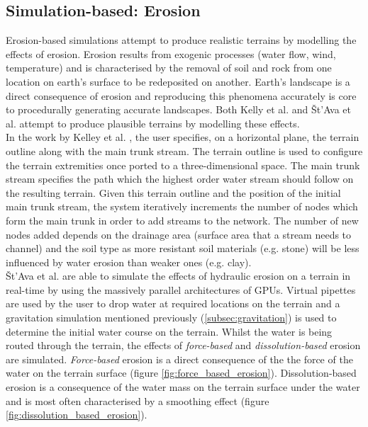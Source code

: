 \subsection{Simulation-based: Erosion}

Erosion-based simulations attempt to produce realistic terrains by modelling the effects of erosion. Erosion results from exogenic processes (water flow, wind, temperature) and is characterised by the removal of soil and rock from one location on earth's surface to be redeposited on another. Earth's landscape is a direct consequence of erosion and reproducing this phenomena accurately is core to procedurally generating accurate landscapes. Both Kelly et al. \cite{Kelley1988} and Št'Ava et al. \cite{StAva2008} attempt to produce plausible terrains by modelling these effects.\\

In the work by Kelley et al. \cite{Kelley1988}, the user specifies, on a horizontal plane, the terrain outline along with the main trunk stream. The terrain outline is used to configure the terrain extremities once ported to a three-dimensional space. The main trunk stream specifies the path which the highest order water stream should follow on the resulting terrain. Given this terrain outline and the position of the initial main trunk stream, the system iteratively increments the number of nodes which form the main trunk in order to add streams to the network. The number of new nodes added depends on the drainage area (surface area that a stream needs to channel) and the soil type as more resistant soil materials (e.g. stone) will be less influenced by water erosion than weaker ones (e.g. clay). \\

Št'Ava et al. \cite{StAva2008} are able to simulate the effects of hydraulic erosion on a terrain in real-time by using the massively parallel architectures of GPUs. Virtual pipettes are used by the user to drop water at required locations on the terrain and a gravitation simulation mentioned previously (\ref{subsec:gravitation}) is used to determine the initial water course on the terrain. Whilst the water is being routed through the terrain, the effects of \textit{force-based} and \textit{dissolution-based} erosion are simulated. \textit{Force-based} erosion is a direct consequence of the the force of the water on the terrain surface (figure \ref{fig:force_based_erosion}). Dissolution-based erosion is a consequence of the water mass on the terrain surface under the water and is most often characterised by a smoothing effect (figure \ref{fig:dissolution_based_erosion}).\\

